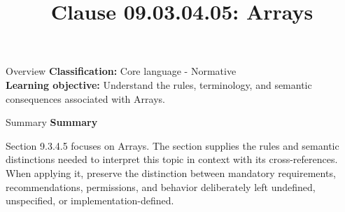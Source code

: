 \documentclass[10pt,letterpaper]{article}
\title{Clause 09.03.04.05: Arrays}
\author{}
\date{}
\begin{document}
\maketitle
\begin{CornellOverviewBox}{Overview}
\textbf{Classification:} Core language - Normative\\[2pt]
\textbf{Learning objective:} Understand the rules, terminology, and semantic consequences associated with Arrays.
\end{CornellOverviewBox}\begin{CornellSummaryBox}{Summary}
{\sffamily\bfseries\color{Accent} Summary}\par\vspace{3pt}Section 9.3.4.5 focuses on Arrays. The section supplies the rules and semantic distinctions needed to interpret this topic in context with its cross-references. When applying it, preserve the distinction between mandatory requirements, recommendations, permissions, and behavior deliberately left undefined, unspecified, or implementation-defined.
\end{CornellSummaryBox}
\end{document}
